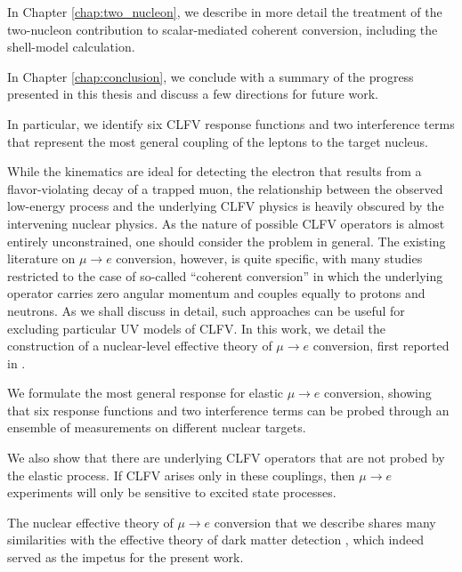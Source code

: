 \documentclass{book}[letterpaper,12pt]
\begin{document}
In Chapter \ref{chap:two_nucleon}, we describe in more detail the treatment of the two-nucleon contribution to scalar-mediated coherent conversion, including the shell-model calculation.

In Chapter \ref{chap:conclusion}, we conclude with a summary of the progress presented in this thesis and discuss a few directions for future work. 

In particular, we identify six CLFV response functions and two interference terms that represent the most general coupling of the leptons to the target nucleus.
 
While the kinematics are ideal for detecting the electron that results from a flavor-violating decay of a trapped muon, the relationship between the observed low-energy process and the underlying CLFV physics is heavily obscured by the intervening nuclear physics. As the nature of possible CLFV operators is almost entirely unconstrained, one should consider the problem in general. The existing literature on $\mu\rightarrow e$ conversion, however, is quite specific, with many studies restricted to the case of so-called ``coherent conversion'' in which the underlying operator carries zero angular momentum and couples equally to protons and neutrons. As we shall discuss in detail, such approaches can be useful for excluding particular UV models of CLFV. In this work, we detail the construction of a nuclear-level effective theory of $\mu\rightarrow e$ conversion, first reported in \cite{rule2021nucleonlevel}. 

 We formulate the most general response for elastic $\mu\rightarrow e$ conversion, showing that six response functions and two interference terms can be probed through an ensemble of measurements on different nuclear targets. 
 
We also show that there are underlying CLFV operators that are not probed by the elastic process. If CLFV arises only in these couplings, then $\mu\rightarrow e$ experiments will only be sensitive to excited state processes.

The nuclear effective theory of $\mu\rightarrow e$ conversion that we describe shares many similarities with the effective theory of dark matter detection \cite{Fitzpatrick_2013}, which indeed served as the impetus for the present work.
\end{document}
